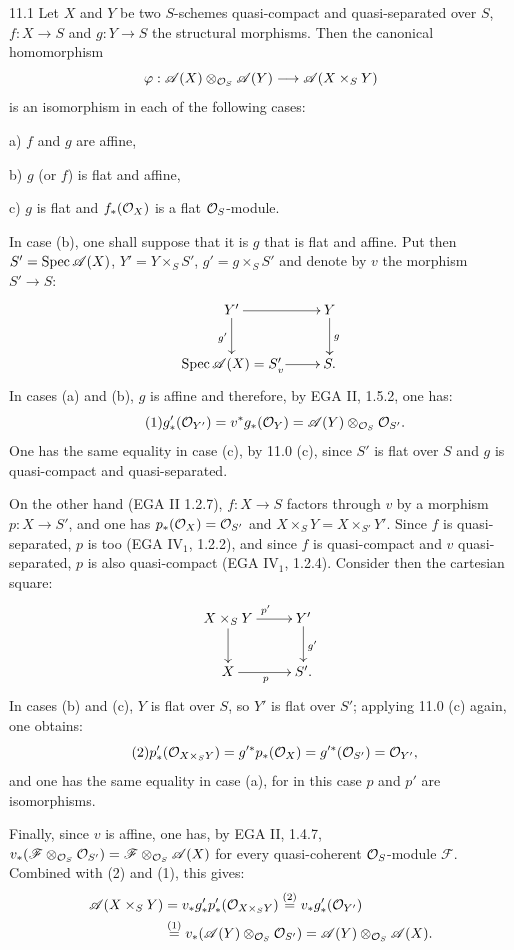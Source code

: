 \begin{lemma}{11.1}\label{VIB.11.1}
Let $X$ and $Y$ be two $S$-schemes quasi-compact and quasi-separated over $S$, $f:X\to S$ and $g:Y\to S$ the structural morphisms. Then the canonical homomorphism
\[
\varphi:\mathscr A(X)\otimes_{\mathcal{O}_S}\mathscr A(Y)\longrightarrow\mathscr A(X\times_S Y)
\]
is an isomorphism in each of the following cases:

a) $f$ and $g$ are affine,

b) $g$ (or $f$) is flat and affine,

c) $g$ is flat and $f_*(\mathcal{O}_X)$ is a flat $\mathcal{O}_S$-module.
\end{lemma}
In case (b), one shall suppose that it is $g$ that is flat and affine. Put then $S'=\operatorname{Spec}\mathscr A(X)$, $Y'=Y\times_S S'$, $g'=g\times_S S'$ and denote by $v$ the morphism $S'\to S$:
\[
\xymatrix{Y'\ar[r]\ar[d]_{g'}&Y\ar[d]^g\\\Spec\mathscr A(X)=S'\ar[r]_v&S.}
\]
In cases (a) and (b), $g$ is affine and therefore, by EGA II, 1.5.2, one has:
\begin{equation*}\tag{1}
g'_*(\mathcal{O}_{Y'})=v^*g_*(\mathcal{O}_Y)=\mathscr A(Y)\otimes_{\mathcal{O}_S}\mathcal{O}_{S'}.
\end{equation*}
One has the same equality in case (c), by 11.0 (c), since $S'$ is flat over $S$ and $g$ is quasi-compact and quasi-separated.

On the other hand (EGA II 1.2.7), $f:X\to S$ factors through $v$ by a morphism $p:X\to S'$, and one has $p_*(\mathcal{O}_X)=\mathcal{O}_{S'}$ and $X\times_S Y=X\times_{S'}Y'$. Since $f$ is quasi-separated, $p$ is too (EGA IV$_1$, 1.2.2), and since $f$ is quasi-compact and $v$ quasi-separated, $p$ is also quasi-compact (EGA IV$_1$, 1.2.4). Consider then the cartesian square:
\[
\xymatrix{X\times_S Y\ar[r]^{p'}\ar[d]&Y'\ar[d]^{g'}\\X\ar[r]_p&S'.}
\]
In cases (b) and (c), $Y$ is flat over $S$, so $Y'$ is flat over $S'$; applying 11.0 (c) again, one obtains:
\begin{equation*}\tag{2}
p'_*(\mathcal{O}_{X\times_S Y})=g'^*p_*(\mathcal{O}_X)=g'^*(\mathcal{O}_{S'})=\mathcal{O}_{Y'},
\end{equation*}
and one has the same equality in case (a), for in this case $p$ and $p'$ are isomorphisms.

Finally, since $v$ is affine, one has, by EGA II, 1.4.7, $v_*(\mathscr F\otimes_{\mathcal{O}_S}\mathcal{O}_{S'})=\mathscr F\otimes_{\mathcal{O}_S}\mathscr A(X)$ for every quasi-coherent $\mathcal{O}_S$-module $\mathscr F$. Combined with (2) and (1), this gives:
\begin{align*}
\mathscr A(X\times_S Y)&=v_*g'_*p'_*(\mathcal{O}_{X\times_S Y})\overset{(2)}=v_*g'_*(\mathcal{O}_{Y'})\\
&\overset{(1)}=v_*(\mathscr A(Y)\otimes_{\mathcal{O}_S}\mathcal{O}_{S'})=\mathscr A(Y)\otimes_{\mathcal{O}_S}\mathscr A(X).
\end{align*}

